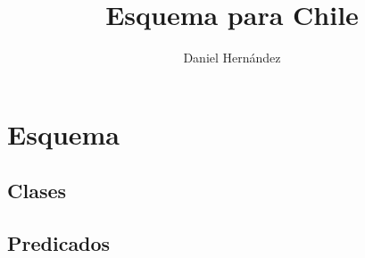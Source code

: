 \documentclass{article}
\title{Esquema para Chile}
\author{Daniel Hernández}
\begin{document}
\maketitle

\tableofcontents

\section{Esquema}

\subsection{Clases}



\subsection{Predicados}


\end{document}
